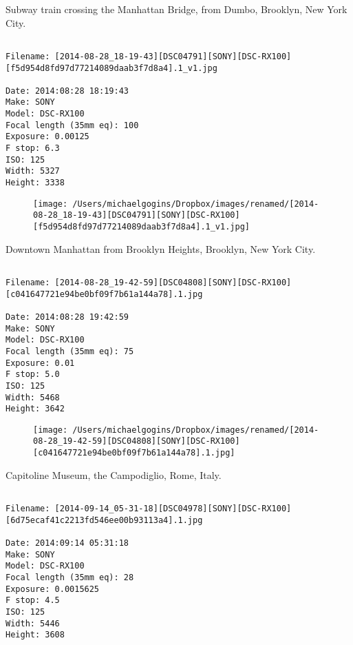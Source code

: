 \documentclass[11pt,letter,DIV=14,paper=landscape]{scrbook}
\begin{document}
\clearpage
\noindent Subway train crossing the Manhattan Bridge, from Dumbo, Brooklyn, New York City.
\noindent
\begin{lstlisting}

Filename: [2014-08-28_18-19-43][DSC04791][SONY][DSC-RX100][f5d954d8fd97d77214089daab3f7d8a4].1_v1.jpg

Date: 2014:08:28 18:19:43
Make: SONY
Model: DSC-RX100
Focal length (35mm eq): 100
Exposure: 0.00125
F stop: 6.3
ISO: 125
Width: 5327
Height: 3338
\end{lstlisting}
\clearpage

\begin{figure}
\texttt{[image: /Users/michaelgogins/Dropbox/images/renamed/[2014-08-28\_18-19-43][DSC04791][SONY][DSC-RX100][f5d954d8fd97d77214089daab3f7d8a4].1\_v1.jpg]}
\end{figure}
    
\clearpage
\noindent Downtown Manhattan from Brooklyn Heights, Brooklyn, New York City.
\noindent
\begin{lstlisting}

Filename: [2014-08-28_19-42-59][DSC04808][SONY][DSC-RX100][c041647721e94be0bf09f7b61a144a78].1.jpg

Date: 2014:08:28 19:42:59
Make: SONY
Model: DSC-RX100
Focal length (35mm eq): 75
Exposure: 0.01
F stop: 5.0
ISO: 125
Width: 5468
Height: 3642
\end{lstlisting}
\clearpage

\begin{figure}
\texttt{[image: /Users/michaelgogins/Dropbox/images/renamed/[2014-08-28\_19-42-59][DSC04808][SONY][DSC-RX100][c041647721e94be0bf09f7b61a144a78].1.jpg]}
\end{figure}
    
\clearpage
\noindent Capitoline Museum, the Campodiglio, Rome, Italy.
\noindent
\begin{lstlisting}

Filename: [2014-09-14_05-31-18][DSC04978][SONY][DSC-RX100][6d75ecaf41c2213fd546ee00b93113a4].1.jpg

Date: 2014:09:14 05:31:18
Make: SONY
Model: DSC-RX100
Focal length (35mm eq): 28
Exposure: 0.0015625
F stop: 4.5
ISO: 125
Width: 5446
Height: 3608
\end{lstlisting}
\clearpage
\end{document}
